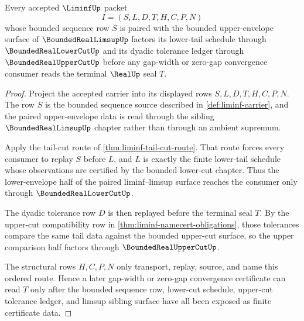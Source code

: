 \begin{theorem}
\label{thm:liminf-tail-lower-envelope-compatibility}
Every accepted $\LiminfUp$ packet
$$
I=(S,L,D,T,H,C,P,N)
$$
whose bounded sequence row $S$ is paired with the bounded upper-envelope surface of $\BoundedRealLimsupUp$ factors its lower-tail schedule through $\BoundedRealLowerCutUp$ and its dyadic tolerance ledger through $\BoundedRealUpperCutUp$ before any gap-width or zero-gap convergence consumer reads the terminal $\RealUp$ seal $T$.
\end{theorem}
\begin{proof}
Project the accepted carrier into its displayed rows $S,L,D,T,H,C,P,N$. The row $S$ is the bounded sequence source described in \autoref{def:liminf-carrier}, and the paired upper-envelope data is read through the sibling $\BoundedRealLimsupUp$ chapter rather than through an ambient supremum.

Apply the tail-cut route of \autoref{thm:liminf-tail-cut-route}. That route forces every consumer to replay $S$ before $L$, and $L$ is exactly the finite lower-tail schedule whose observations are certified by the bounded lower-cut chapter. Thus the lower-envelope half of the paired liminf--limsup surface reaches the consumer only through $\BoundedRealLowerCutUp$.

The dyadic tolerance row $D$ is then replayed before the terminal seal $T$. By the upper-cut compatibility row in \autoref{thm:liminf-namecert-obligations}, those tolerances compare the same tail data against the bounded upper-cut surface, so the upper comparison half factors through $\BoundedRealUpperCutUp$.

The structural rows $H,C,P,N$ only transport, replay, source, and name this ordered route. Hence a later gap-width or zero-gap convergence certificate can read $T$ only after the bounded sequence row, lower-cut schedule, upper-cut tolerance ledger, and limsup sibling surface have all been exposed as finite certificate data.
\end{proof}

